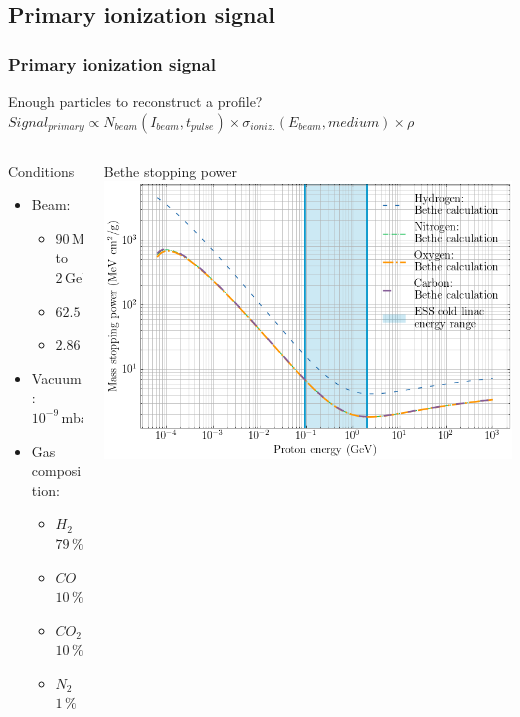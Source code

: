 \subsection{Primary ionization signal}
\begin{frame}[t]
  \frametitle{Primary ionization signal}
  \begin{block}{Enough particles to reconstruct a profile?}
    $Signal_{primary} \propto N_{beam}(I_{beam},t_{pulse}) \times \sigma_{ioniz.}(E_{beam},medium)\times \rho$
  \end{block}
  \begin{columns}
    \begin{column}{0.35\textwidth}
      \begin{block}{Conditions}
        \begin{itemize}
          \item Beam:
                \begin{itemize}
                  \item $90\,\mathrm{MeV}$ to $2\,\mathrm{GeV}$
                  \item $62.5\,\mathrm{mA}$
                  \item $2.86\,\mathrm{ms}$
                \end{itemize}
          \item Vacuum: $10^{-9}\,\mathrm{mbar}$
          \item Gas composition:
                \begin{itemize}
                  \item $H_2$ $79\,\%$
                  \item $CO$ $10\,\%$
                  \item $CO_2$ $10\,\%$
                  \item $N_2$ $1\,\%$
                \end{itemize}
        \end{itemize}
      \end{block}
    \end{column}
    \begin{column}{0.60\textwidth}
      \centering
      Bethe stopping power
      \includegraphics[width=\textwidth]{03_SIM/fig/fig000_Bethe_ESS}
    \end{column}
  \end{columns}
\end{frame}

